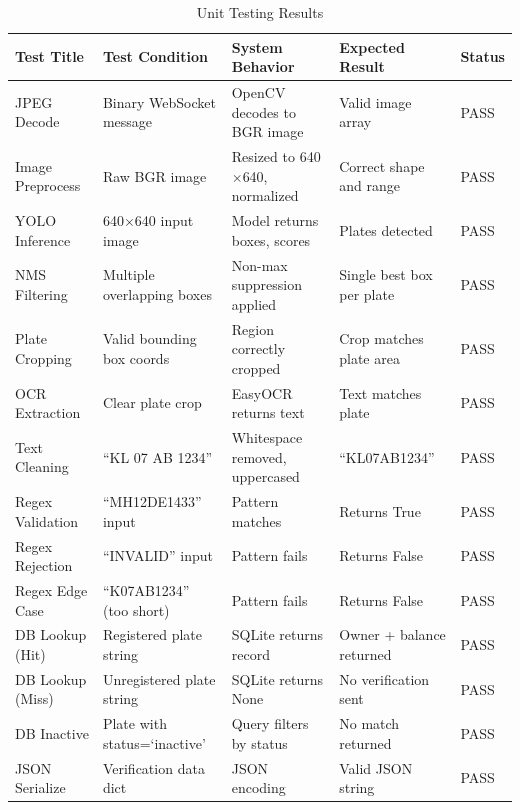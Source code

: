 \documentclass[11pt]{report}
\begin{document}
\begin{table}[H]
\centering
\renewcommand{\arraystretch}{1.4}
\setlength{\tabcolsep}{3pt}
\footnotesize
\begin{tabular}{| m{2.3cm} | m{3.2cm} | m{3.5cm} | m{3.2cm} | m{1.2cm} |}
\hline
\textbf{Test Title} & \textbf{Test Condition} & \textbf{System Behavior} & \textbf{Expected Result} & \textbf{Status} \\
\hline
JPEG Decode & Binary WebSocket message & OpenCV decodes to BGR image & Valid image array & PASS \\
\hline
Image Preprocess & Raw BGR image & Resized to 640$\times$640, normalized & Correct shape and range & PASS \\
\hline
YOLO Inference & 640$\times$640 input image & Model returns boxes, scores & Plates detected & PASS \\
\hline
NMS Filtering & Multiple overlapping boxes & Non-max suppression applied & Single best box per plate & PASS \\
\hline
Plate Cropping & Valid bounding box coords & Region correctly cropped & Crop matches plate area & PASS \\
\hline
OCR Extraction & Clear plate crop & EasyOCR returns text & Text matches plate & PASS \\
\hline
Text Cleaning & ``KL 07 AB 1234'' & Whitespace removed, uppercased & ``KL07AB1234'' & PASS \\
\hline
Regex Validation & ``MH12DE1433'' input & Pattern matches & Returns True & PASS \\
\hline
Regex Rejection & ``INVALID'' input & Pattern fails & Returns False & PASS \\
\hline
Regex Edge Case & ``K07AB1234'' (too short) & Pattern fails & Returns False & PASS \\
\hline
DB Lookup (Hit) & Registered plate string & SQLite returns record & Owner + balance returned & PASS \\
\hline
DB Lookup (Miss) & Unregistered plate string & SQLite returns None & No verification sent & PASS \\
\hline
DB Inactive & Plate with status=`inactive' & Query filters by status & No match returned & PASS \\
\hline
JSON Serialize & Verification data dict & JSON encoding & Valid JSON string & PASS \\
\hline
\end{tabular}
\caption{Unit Testing Results}
\end{table}
\end{document}
